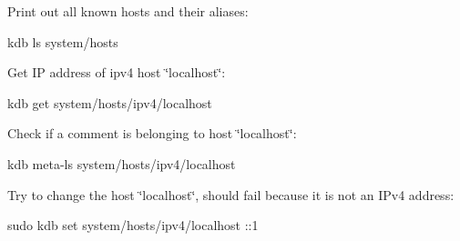 Print out all known hosts and their aliases\+:


\begin{DoxyCode}
kdb ls system/hosts
\end{DoxyCode}


Get IP address of ipv4 host \char`\"{}localhost\char`\"{}\+:


\begin{DoxyCode}
kdb get system/hosts/ipv4/localhost
\end{DoxyCode}


Check if a comment is belonging to host \char`\"{}localhost\char`\"{}\+:


\begin{DoxyCode}
kdb meta-ls system/hosts/ipv4/localhost
\end{DoxyCode}


Try to change the host \char`\"{}localhost\char`\"{}, should fail because it is not an I\+Pv4 address\+:


\begin{DoxyCode}
sudo kdb set system/hosts/ipv4/localhost ::1
\end{DoxyCode}


